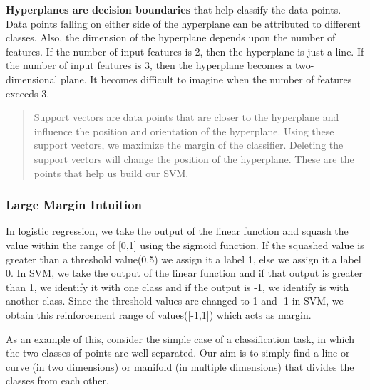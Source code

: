 \documentclass[11pt]{article}
\begin{document}
\textbf{Hyperplanes are decision boundaries} that help classify the data
points. Data points falling on either side of the hyperplane can be
attributed to different classes. Also, the dimension of the hyperplane
depends upon the number of features. If the number of input features is
2, then the hyperplane is just a line. If the number of input features
is 3, then the hyperplane becomes a two-dimensional plane. It becomes
difficult to imagine when the number of features exceeds 3.

\begin{quote}
Support vectors are data points that are closer to the hyperplane and
influence the position and orientation of the hyperplane. Using these
support vectors, we maximize the margin of the classifier. Deleting the
support vectors will change the position of the hyperplane. These are
the points that help us build our SVM.
\end{quote}

\hypertarget{large-margin-intuition}{%
\subsubsection{Large Margin Intuition}\label{large-margin-intuition}}

In logistic regression, we take the output of the linear function and
squash the value within the range of {[}0,1{]} using the sigmoid
function. If the squashed value is greater than a threshold value(0.5)
we assign it a label 1, else we assign it a label 0. In SVM, we take the
output of the linear function and if that output is greater than 1, we
identify it with one class and if the output is -1, we identify is with
another class. Since the threshold values are changed to 1 and -1 in
SVM, we obtain this reinforcement range of values({[}-1,1{]}) which acts
as margin.

    As an example of this, consider the simple case of a classification
task, in which the two classes of points are well separated. Our aim is
to simply find a line or curve (in two dimensions) or manifold (in
multiple dimensions) that divides the classes from each other.
\end{document}
